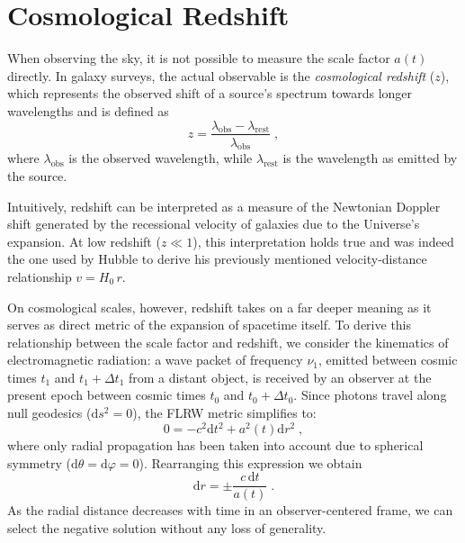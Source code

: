 \documentclass[12pt,a4paper,oneside]{report}
\begin{document}
\section{Cosmological Redshift}\label{sec:CosmologicalRedshift}
When observing the sky, it is not possible to measure the scale factor $a(t)$ directly. In galaxy surveys, the actual observable is the \textit{cosmological redshift} ($z$), which represents the observed shift of a source's spectrum towards longer wavelengths and is defined as
\begin{equation}
  z = \frac{\lambda_\mathrm{obs} - \lambda_\mathrm{rest}}{\lambda_\mathrm{obs}} \; ,
  \label{eq:Redshift_def}
\end{equation}
where $\lambda_\mathrm{obs}$ is the observed wavelength, while $\lambda_\mathrm{rest}$ is the wavelength as emitted by the source. 

Intuitively, redshift can be interpreted as a measure of the Newtonian Doppler shift generated by the recessional velocity of galaxies due to the Universe’s expansion. At low redshift ($z \ll 1$), this interpretation holds true and was indeed the one used by Hubble to derive his previously mentioned velocity-distance relationship $v = H_0 \, r$.

On cosmological scales, however, redshift takes on a far deeper meaning as it serves as direct metric of the expansion of spacetime itself. To derive this relationship between the scale factor and redshift, we consider the kinematics of electromagnetic radiation: a wave packet of frequency $\nu_1$, emitted between cosmic times $t_1$ and $t_1 + \Delta t_1$ from a distant object, is received by an observer at the present epoch between cosmic times $t_0$ and $t_0 + \Delta t_0$. Since photons travel along null geodesics ($\mathrm{d} s^2 = 0 $), the FLRW metric simplifies to:
\begin{equation}
  0 = -c^2 \mathrm{d} t^2 + a^2(t) \mathrm{d} r^2 \; ,
  \label{eq:NullGeodesics}
\end{equation}
where only radial propagation has been taken into account due to spherical symmetry ($\mathrm{d}\theta = \mathrm{d}\varphi = 0$). Rearranging this expression we obtain
\begin{equation}
  \mathrm{d} r = \pm \frac{c \, \mathrm{d} t}{a(t)} \; .
  \label{eq:NullGeodesics_2}
\end{equation}
As the radial distance decreases with time in an observer-centered frame, we can select the negative solution without any loss of generality.
\end{document}
